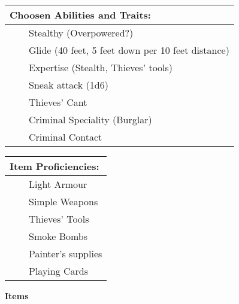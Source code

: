 \documentclass[11pt]{article}
\newcommand{\tabitem}{~~\llap{--}~~}
\begin{document}
\begin{multicols}{2}
\vspace{4mm}

\noindent \begin{tabularx}{95mm}{@{}l}
{\Large \textbf{Choosen Abilities and Traits:}} \\
\hline
\tabitem Stealthy (Overpowered?) \\
\tabitem Glide (40 feet, 5 feet down per 10 feet distance) \\
\tabitem Expertise (Stealth, Thieves' tools) \\
\tabitem Sneak attack (1d6) \\
\tabitem Thieves' Cant \\
\tabitem Criminal Speciality (Burglar) \\
\tabitem Criminal Contact
		\end{tabularx}

\vspace{4mm}

\noindent \begin{tabularx}{95mm}{@{}l}
{\Large \textbf{Item Proficiencies:}} \\
\hline
\tabitem Light Armour \\
\tabitem Simple Weapons \\
\tabitem Thieves' Tools \\
\tabitem Smoke Bombs \\
\tabitem Painter's supplies \\
\tabitem Playing Cards
		\end{tabularx}
	\end{multicols}

\clearpage

	\begin{center}
{\LARGE \textbf{Items}}
	\end{center}
\end{document}
